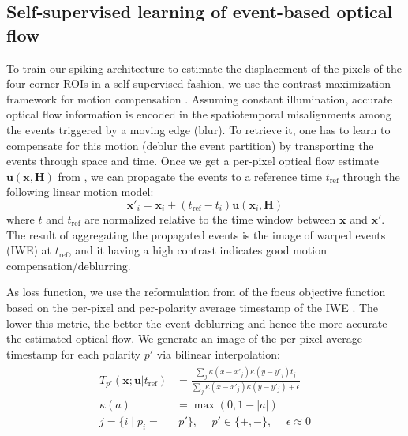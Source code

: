 \subsection*{Self-supervised learning of event-based optical flow}

To train our spiking architecture to estimate the displacement of the pixels of the four corner ROIs in a self-supervised fashion, we use the contrast maximization framework for motion compensation \cite{gallego2018unifying, gallego2019focus}. Assuming constant illumination, accurate optical flow information is encoded in the spatiotemporal misalignments among the events triggered by a moving edge (blur). To retrieve it, one has to learn to compensate for this motion (deblur the event partition) by transporting the events through space and time. Once we get a per-pixel optical flow estimate $\boldsymbol{u}(\boldsymbol{x}, \boldsymbol{H})$ from , we can propagate the events to a reference time $t_{\text{ref}}$ through the following linear motion model:
\begin{equation}\label{eq:sr_motionmodel}
    \boldsymbol{x}'_i=\boldsymbol{x}_i + (t_{\text{ref}} - t_i)\boldsymbol{
    u}(\boldsymbol{x}_i, \boldsymbol{H})
\end{equation}
where $t$ and $t_\text{ref}$ are normalized relative to the time window between $\boldsymbol{x}$ and $\boldsymbol{x}'$. The result of aggregating the propagated events is the image of warped events (IWE) at $t_{\text{ref}}$, and it having a high contrast indicates good motion compensation/deblurring. 

As loss function, we use the reformulation from \cite{hagenaars2021selfsupervised} of the focus objective function based on the per-pixel and per-polarity average timestamp of the IWE \cite{mitrokhin2018eventbased,zhu2019unsupervised}. The lower this metric, the better the event deblurring and hence the more accurate the estimated optical flow. We generate an image of the per-pixel average timestamp for each polarity $p'$ via bilinear interpolation:
\begin{align}\label{eq:sr_timeimage}
    \begin{aligned}
        T_{p'}(\boldsymbol{x}{;}\boldsymbol{u} |t_{\text{ref}}) &= \frac{\sum_{j} \kappa(x - x'_{j})\kappa(y - y'_{j})t_{j}}{\sum_{j} \kappa(x - x'_{j})\kappa(y - y'_{j})+\epsilon}\\\kappa(a) &= \max(0, 1-|a|)\\
        j = \{i \mid p_{i}=&\ p'\}, \hspace{15pt}p'\in\{+,-\}, \hspace{15pt} \epsilon\approx 0
    \end{aligned}
\end{align}

